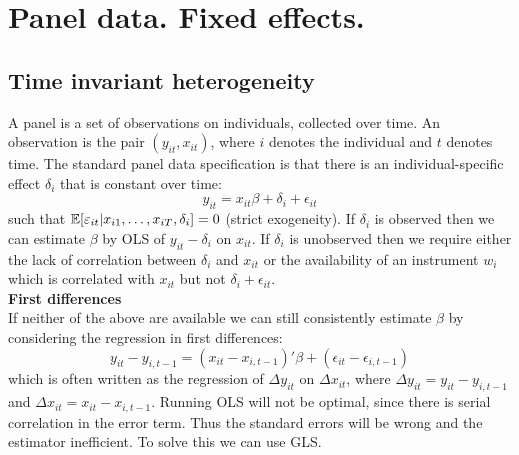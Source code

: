 \documentclass[DIV=14,titlepage=false]{scrreprt}
\begin{document}
\vspace{-10pt}
\setcounter{chapter}{16}
\chapter{Panel data. Fixed effects.}
\section{Time invariant heterogeneity}
A panel is a set of observations on individuals, collected over time. An observation is the pair $(y_{it},x_{it})$, where $i$ denotes the individual and $t$ denotes time. The standard panel data specification is that there is an individual-specific effect $\delta_i$ that is constant over time:\[y_{it}=x_{it}\beta+\delta_i+\epsilon_{it}\] such that $\mathbb{E}[\varepsilon_{it}|x_{i1},\dots,x_{iT},\delta_i]=0$ (strict exogeneity). If $\delta_i$ is observed then we can estimate $\beta$ by OLS of $y_{it}-\delta_i$ on $x_{it}$. If $\delta_i$  is unobserved then we require either the lack of correlation between $\delta_i$ and $x_{it}$ or the availability of an instrument $w_i$ which is correlated with $x_{it}$ but not $\delta_i+\epsilon_{it}$.\\
\textbf{First differences}\\
If neither of the above are available we can still consistently estimate $\beta$ by considering the regression in first differences:\begin{equation} y_{it}-y_{i,t-1}=(x_{it}-x_{i,t-1})'\beta+(\epsilon_{it}-\epsilon_{i,t-1})\end{equation} which is often written as the regression of $\Delta y_{it}$ on $\Delta x_{it}$, where $\Delta y_{it}=y_{it}-y_{i,t-1}$ and $\Delta x_{it}=x_{it}-x_{i,t-1}$. Running OLS will not be optimal, since there is serial correlation in the error term. Thus the standard errors will be wrong and the estimator inefficient. To solve this we can use GLS.
\end{document}
